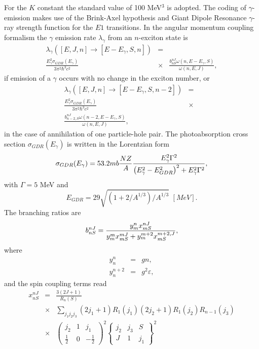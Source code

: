For the $K$ constant the standard value of 100 MeV$^{3}$ is adopted. The
coding of $\gamma$-emission makes use of the Brink-Axel hypothesis \cite%
{Axel,Brink,Brinka} and Giant Dipole Resonance $\gamma$-ray strength
function for the $E1$ transitions. In the angular momentum coupling
formalism the $\gamma$ emission rate $\lambda_{\gamma}$ from an $n$-exciton
state is
\begin{eqnarray}
\lambda_{\gamma}\left(\left[E,J,n\right]\rightarrow\left[E-E_{\gamma},S,n%
\right]\right)&=& \\
\frac{E_{\gamma}^{2}\sigma_{GDR}(E_{\gamma})}{3\pi^{2}\hbar^{3}c^{2}}&\times&%
\frac{b_{nS}^{nJ}\omega(n,E-E_{\gamma},S)}{\omega(n,E,J)} ,  \nonumber
\end{eqnarray}
if emission of a $\gamma$ occurs with no change in the exciton number, or
\begin{eqnarray}
\lambda_{\gamma}\left(\left[E,J,n\right]\rightarrow\left[E-E_{\gamma},S,n-2%
\right]\right)&=&  \nonumber \\
\frac{E_{\gamma}^{2}\sigma_{GDR}(E_{\gamma})}{3\pi^{2}\hbar^{3}c^{2}}&\times&
\nonumber \\
\frac{b_{n-2,S}^{nJ}\omega(n-2,E-E_{\gamma},S)}{\omega(n,E,J)},&&
\end{eqnarray}
in the case of annihilation of one particle-hole pair. The photoabsorption
cross section $\sigma_{GDR}(E_{\gamma})$ is written in the Lorentzian form
\begin{equation}
\sigma_{GDR}(E_{\gamma})=53.2mb\frac{NZ}{A}\frac{E_{\gamma}^{2}\Gamma^{2}}{%
\left(E_{\gamma}^{2}-E_{GDR}^{2}\right)^{2}+E_{\gamma}^{2}\Gamma^{2}},
\end{equation}
with $\Gamma=5$ MeV and
\begin{equation}
E_{GDR}=29\sqrt{\left(1+2/A^{1/3}\right)/A^{1/3}}\,\,[MeV].
\end{equation}
The branching ratios are
\begin{equation}
b_{nS}^{nJ}=\frac{y_{m}^{n}x_{mS}^{nJ}}{%
y_{m}^{m}x_{mS}^{mJ}+y_{m}^{m+2}x_{mS}^{m+2,J}},
\end{equation}
\noindent where
\begin{eqnarray}
y_{n}^{n} & = & gn,  \nonumber \\
y_{n}^{n+2} & = & g^{2}\varepsilon,
\end{eqnarray}
and the spin coupling terms read
\begin{eqnarray}
x_{nS}^{nJ} & = & \frac{3(2J+1)}{R_{n}(S)}  \nonumber \\
& \times
&\sum_{j_{1}j_{2}j_{3}}(2j_{1}+1)R_{1}(j_{1})(2j_{2}+1)R_{1}(j_{2})R_{n-1}(j_{3})
\nonumber \\
& \times & \left(%
\begin{array}{ccc}
j_{2} & 1 & j_{1} \\
\frac{1}{2} & 0 & -\frac{1}{2}%
\end{array}%
\right)^{2}\left\{
\begin{array}{ccc}
j_{2} & j_{3} & S \\
J & 1 & j_{1}%
\end{array}%
\right\} ^{2}
\end{eqnarray}
